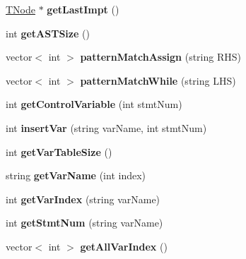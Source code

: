 \begin{DoxyCompactItemize}
\item 
\hypertarget{class_p_k_b_a6f03e63687e9b8233ffe5e4c74808b52}{}\hyperlink{class_t_node}{T\+Node} $\ast$ {\bfseries get\+Last\+Impt} ()\label{class_p_k_b_a6f03e63687e9b8233ffe5e4c74808b52}

\item 
\hypertarget{class_p_k_b_ae87b71cfce8707d411f9df9541aa3f34}{}int {\bfseries get\+A\+S\+T\+Size} ()\label{class_p_k_b_ae87b71cfce8707d411f9df9541aa3f34}

\item 
\hypertarget{class_p_k_b_aa2844f8ae34e714502a197573dc5804c}{}vector$<$ int $>$ {\bfseries pattern\+Match\+Assign} (string R\+H\+S)\label{class_p_k_b_aa2844f8ae34e714502a197573dc5804c}

\item 
\hypertarget{class_p_k_b_a410db4849af9bf5220f5439a5dcd55de}{}vector$<$ int $>$ {\bfseries pattern\+Match\+While} (string L\+H\+S)\label{class_p_k_b_a410db4849af9bf5220f5439a5dcd55de}

\item 
\hypertarget{class_p_k_b_ad58dc44a6828c9638d814f3a782c00e9}{}int {\bfseries get\+Control\+Variable} (int stmt\+Num)\label{class_p_k_b_ad58dc44a6828c9638d814f3a782c00e9}

\item 
\hypertarget{class_p_k_b_a0b2513c2dd6c90dcb3783bad8af8fc2e}{}int {\bfseries insert\+Var} (string var\+Name, int stmt\+Num)\label{class_p_k_b_a0b2513c2dd6c90dcb3783bad8af8fc2e}

\item 
\hypertarget{class_p_k_b_a223f730c7dd475c6b8d82b94fab078ec}{}int {\bfseries get\+Var\+Table\+Size} ()\label{class_p_k_b_a223f730c7dd475c6b8d82b94fab078ec}

\item 
\hypertarget{class_p_k_b_ab66db6b9f5a206262b1ba5d3faa93016}{}string {\bfseries get\+Var\+Name} (int index)\label{class_p_k_b_ab66db6b9f5a206262b1ba5d3faa93016}

\item 
\hypertarget{class_p_k_b_a9fb5448a1020b19e7d75574e1fc2fe0e}{}int {\bfseries get\+Var\+Index} (string var\+Name)\label{class_p_k_b_a9fb5448a1020b19e7d75574e1fc2fe0e}

\item 
\hypertarget{class_p_k_b_ae197e5784d4341492592a3e6b278437b}{}int {\bfseries get\+Stmt\+Num} (string var\+Name)\label{class_p_k_b_ae197e5784d4341492592a3e6b278437b}

\item 
\hypertarget{class_p_k_b_a588f9fa0f6c683965695efb85c7b27c1}{}vector$<$ int $>$ {\bfseries get\+All\+Var\+Index} ()\label{class_p_k_b_a588f9fa0f6c683965695efb85c7b27c1}


\end{DoxyCompactItemize}
